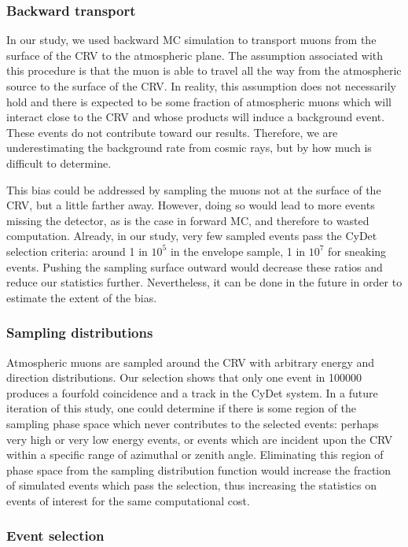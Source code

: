 \subsubsection{Backward transport}
In our study, we used backward MC simulation to transport muons from the surface
of the CRV to the atmospheric plane. The assumption associated with this
procedure is that the muon is able to travel all the way from the atmospheric
source to the surface of the CRV. In reality, this assumption does not
necessarily hold and there is expected to be some fraction of atmospheric muons
which will interact close to the CRV and whose products will induce a background
event. These events do not contribute toward our results. Therefore, we are
underestimating the background rate from cosmic rays, but by how much is
difficult to determine. 

This bias could be addressed by sampling the muons not at the surface of the
CRV, but a little farther away. However, doing so would lead to more events
missing the detector, as is the case in forward MC, and therefore to wasted
computation. Already, in our study, very few sampled events pass the CyDet
selection criteria: around 1 in $10^5$ in the envelope sample, 1 in $10^7$ for
sneaking events. Pushing the sampling surface outward would decrease these
ratios and reduce our statistics further. Nevertheless, it can be done in the
future in order to estimate the extent of the bias.

\subsubsection{Sampling distributions}

Atmospheric muons are sampled around the CRV with arbitrary energy and direction
distributions. Our selection shows that only one event in \num{100000} produces
a fourfold coincidence and a track in the CyDet system. In a future iteration of
this study, one could determine if there is some region of the sampling phase
space which never contributes to the selected events: perhaps very high or very
low energy events, or events which are incident upon the CRV within a specific
range of azimuthal or zenith angle. Eliminating this region of phase space from
the sampling distribution function would increase the fraction of simulated
events which pass the selection, thus increasing the statistics on events of
interest for the same computational cost.


\subsubsection{Event selection}

